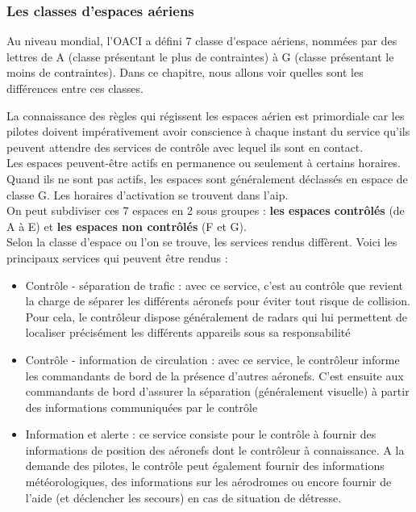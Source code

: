 		\subsubsection{Les classes d'espaces aériens}
		Au niveau mondial, l'OACI a défini 7 \glspl{classe d'espace aérien}, nommées par des lettres de A (classe présentant le plus de contraintes) à G (classe présentant le moins de contraintes). Dans ce chapitre, nous allons voir quelles sont les différences entre ces classes.
		
		La connaissance des règles qui régissent les espaces aérien est primordiale car les pilotes doivent impérativement avoir conscience à chaque instant du service qu'ils peuvent attendre des services de contrôle avec lequel ils sont en contact.\\
		
		Les espaces peuvent-être actifs en permanence ou seulement à certains horaires. Quand ils ne sont pas actifs, les espaces sont généralement déclassés en espace de classe G. Les horaires d'activation se trouvent dans l'\acrshort{aip}. \\
		
		On peut subdiviser ces 7 espaces en 2 sous groupes : \textbf{les espaces contrôlés} (de A à E) et \textbf{les espaces non contrôlés} (F et G). \\
		
		Selon la classe d'espace ou l'on se trouve, les services rendus diffèrent. Voici les principaux services qui peuvent être rendus :
		\begin{itemize}
			\item Contrôle - séparation de trafic : avec ce service, c'est au contrôle que revient la charge de séparer les différents aéronefs pour éviter tout risque de collision. Pour cela, le contrôleur dispose généralement de radars qui lui permettent de localiser précisément les différents appareils sous sa responsabilité
			\item Contrôle - information de circulation : avec ce service, le contrôleur informe les commandants de bord de la présence d'autres aéronefs. C'est ensuite aux commandants de bord d'assurer la séparation (généralement visuelle) à partir des informations communiquées par le contrôle
			\item Information et alerte : ce service consiste pour le contrôle à fournir des informations de position des aéronefs dont le contrôleur à connaissance. A la demande des pilotes, le contrôle peut également fournir des informations météorologiques, des informations sur les aérodromes ou encore fournir de l'aide (et déclencher les secours) en cas de situation de détresse.
		\end{itemize}
		
